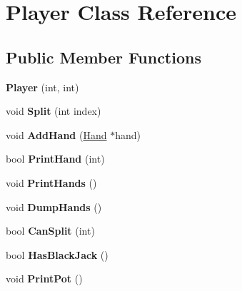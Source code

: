 \hypertarget{class_player}{}\section{Player Class Reference}
\label{class_player}
\subsection*{Public Member Functions}
\begin{DoxyCompactItemize}
\item 
{\bfseries Player} (int, int)\hypertarget{class_player_a6f57cdacb88f4c3c800c1fbf591ed28d}{}\label{class_player_a6f57cdacb88f4c3c800c1fbf591ed28d}

\item 
void {\bfseries Split} (int index)\hypertarget{class_player_a3a627672714563333c44d83faf8a2696}{}\label{class_player_a3a627672714563333c44d83faf8a2696}

\item 
void {\bfseries Add\+Hand} (\hyperlink{class_hand}{Hand} $\ast$hand)\hypertarget{class_player_add15dd07cc4772d4509a49e31b04556b}{}\label{class_player_add15dd07cc4772d4509a49e31b04556b}

\item 
bool {\bfseries Print\+Hand} (int)\hypertarget{class_player_a2142881dd58bd5ac7a7ec75b958069e1}{}\label{class_player_a2142881dd58bd5ac7a7ec75b958069e1}

\item 
void {\bfseries Print\+Hands} ()\hypertarget{class_player_a31326f0143919f9d2412bf094f571a95}{}\label{class_player_a31326f0143919f9d2412bf094f571a95}

\item 
void {\bfseries Dump\+Hands} ()\hypertarget{class_player_a2b8128800c27146c8ecebbbf2d1f4ffa}{}\label{class_player_a2b8128800c27146c8ecebbbf2d1f4ffa}

\item 
bool {\bfseries Can\+Split} (int)\hypertarget{class_player_a228554349109ae4e44ee40209796bb16}{}\label{class_player_a228554349109ae4e44ee40209796bb16}

\item 
bool {\bfseries Has\+Black\+Jack} ()\hypertarget{class_player_ae7d44ce9ba3598f2e42ff3b8dbfa78a2}{}\label{class_player_ae7d44ce9ba3598f2e42ff3b8dbfa78a2}

\item 
void {\bfseries Print\+Pot} ()\hypertarget{class_player_a1129e1688f9243b849a4707809d44d10}{}\label{class_player_a1129e1688f9243b849a4707809d44d10}


\end{DoxyCompactItemize}
